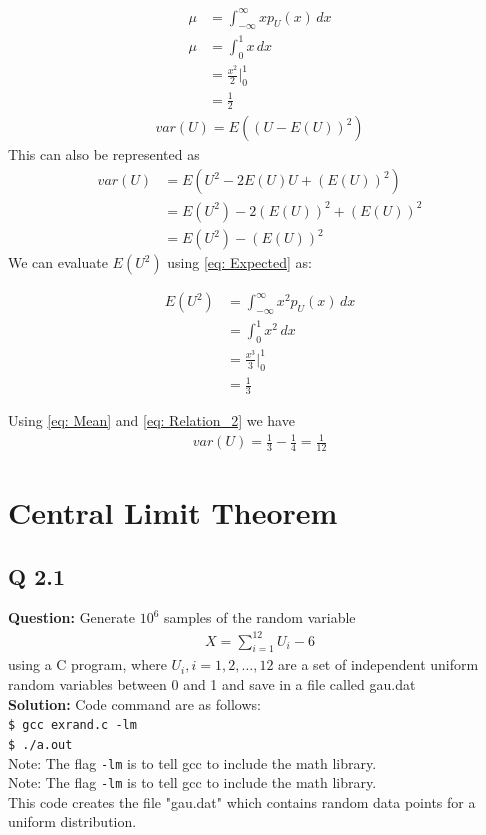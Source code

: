 \documentclass[journal,12pt,twocolumn]{IEEEtran}
\begin{document}
\begin{align}
    \mu &= \int_{-\infty}^{\infty} x p_U(x) \,dx\label{eq:Relation_1}\\
		\mu &= \int_{0}^{1} x \,dx \\
		&= \frac{x^2}{2} \big|^{1}_{0} \\
		&= \frac{1}{2} 	\label{eq: Mean}
\end{align}
\begin{align}
    var(U) = E((U - E(U))^2)
\end{align}
This can also be represented as
\begin{align}
		var(U) &= E(U^2 - 2E(U)U + (E(U))^2) \\
		&= E(U^2) - 2(E(U))^2 + (E(U))^2 \\
		&= E(U^2) - (E(U))^2
		\label{eq: Relation_2}
\end{align}
We can evaluate $E(U^2)$ using \eqref{eq: Expected} as:
	
\begin{align}
    	E(U^2) &= \int_{-\infty}^{\infty} x^2 p_U(x) \,dx \\
    	&= \int_{0}^{1} x^2 \,dx \\
    	&= \frac{x^3}{3} \big|^{1}_{0} \\
    	&= \frac{1}{3}
\end{align}

    Using \eqref{eq: Mean} and \eqref{eq: Relation_2} we have
\begin{align}
    	var(U) = \frac{1}{3} - \frac{1}{4} = \frac{1}{12}
\end{align}

\section{Central Limit Theorem}
\subsection{Q 2.1}
\noindent \textbf{Question:} Generate $10^6$ samples of the random variable\\
%
\begin{align}
X = \sum_{i=1}^{12}U_i -6
\end{align}
%
using a C program, where $U_i, i = 1,2,\dots, 12$ are  a set of independent uniform random variables between 0 and 1
and save in a file called gau.dat\\

\noindent \textbf{Solution:}
Code command are as follows:\\
\texttt{\$ gcc exrand.c -lm}\\
\texttt{\$ ./a.out}\\
Note: The flag \texttt{-lm} is to tell gcc to include the math library.\\
Note: The flag \texttt{-lm} is to tell gcc to include the math library.\\ 
This code creates the file "gau.dat" which contains random data points for a uniform distribution.
\end{document}

